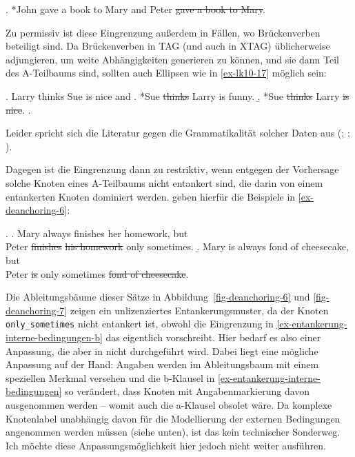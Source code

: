\ex.  *John gave a book to Mary and Peter \sout{gave a book to Mary}. \hfill
\citep[(13)]{Lichte:Kallmeyer:10}\label{ex-deanchoring-5}

Zu permissiv ist diese Eingrenzung  au\ss erdem in Fällen, wo Brückenverben beteiligt sind. Da  Brückenverben in TAG (und auch in XTAG) üblicherweise adjungieren, um weite Abhängigkeiten generieren zu können, und sie dann Teil des A-Teilbaums sind, sollten auch Ellipsen wie in \ref{ex-lk10-17} möglich sein:    

\ex. Larry thinks Sue is nice and \label{ex-lk10-17}
\a. *Sue \sout{thinks} Larry is funny.
\b. *Sue \sout{thinks} Larry \sout{is nice}.
\z. \citep[(17)]{Lichte:Kallmeyer:10}

Leider spricht sich die Literatur gegen die Grammatikalität solcher Daten aus (\citealt[198]{Sag:76}; \citealt[18]{Johnson:04}; \citealt[1149]{Osborne:08}). 

Dagegen ist die Eingrenzung dann zu restriktiv, wenn entgegen der Vorhersage solche Knoten eines A-Teilbaums nicht entankert sind, die darin von einem entankerten Knoten dominiert werden. \cite{Lichte:Kallmeyer:10} geben hierfür die Beispiele in \ref{ex-deanchoring-6}:   

\ex. \label{ex-deanchoring-6}
\a. Mary always finishes her homework, but \\
Peter \sout{finishes}  \sout{his homework} only sometimes. \label{ex-deanchoring-6-a}
\b. Mary is always fond of cheesecake, but \\
Peter \sout{is} only sometimes \sout{fond of cheesecake}. \label{ex-deanchoring-6-b}

Die Ableitungsbäume dieser Sätze in Abbildung~\ref{fig-deanchoring-6} und \ref{fig-deanchoring-7} zeigen ein unlizenziertes Ent\-ankerungsmuster, da der Knoten {\tt only\_sometimes} nicht entankert ist, obwohl die Eingrenzung in \ref{ex-entankerung-interne-bedingungen-b} das eigentlich vorschreibt. Hier bedarf es also einer Anpassung, die aber in \cite{Lichte:Kallmeyer:10} nicht durchgeführt wird. Dabei liegt eine mögliche Anpassung auf der Hand: Angaben werden im Ableitungsbaum mit einem speziellen Merkmal versehen und die b-Klausel in \ref{ex-entankerung-interne-bedingungen} so verändert, dass Knoten mit Angabenmarkierung davon ausgenommen werden -- womit auch die a-Klausel obsolet wäre. Da komplexe Knotenlabel unabhängig davon für die Modellierung der externen Bedingungen  angenommen werden müssen (siehe unten), ist das kein technischer Sonderweg. Ich möchte diese Anpassungsmöglichkeit hier jedoch nicht weiter ausführen.

